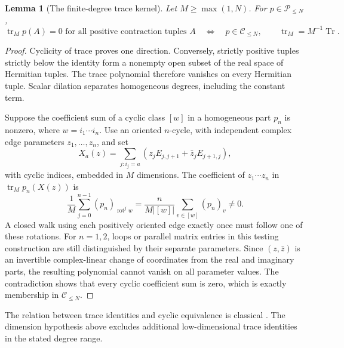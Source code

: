 \documentclass[11pt,a4paper]{amsart}
\numberwithin{equation}{section}
\newtheorem{lemma}[theorem]{Lemma}
\theoremstyle{definition}
\theoremstyle{remark}
\newcommand{\PP}{\mathcal P}
\DeclareMathOperator{\Tr}{Tr}
\DeclareMathOperator{\tr}{tr}
\begin{document}
\begin{lemma}[The finite-degree trace kernel]\label{lem:cyclic_trace_kernel}
Let $M\ge\max(1,N)$. For $p\in\PP_{\le N}$,
\begin{equation}\label{eq:trace_kernel_iff}
 \tr_Mp(A)=0\text{ for all positive contraction tuples }A
 \quad\Longleftrightarrow\quad p\in\mathscr C_{\le N},
 \qquad \tr_M=M^{-1}\Tr.
\end{equation}
\end{lemma}
\begin{proof}
Cyclicity of trace proves one direction. Conversely, strictly positive tuples strictly below the identity form a nonempty open subset of the real space of Hermitian tuples. The trace polynomial therefore vanishes on every Hermitian tuple. Scalar dilation separates homogeneous degrees, including the constant term.

Suppose the coefficient sum of a cyclic class $[w]$ in a homogeneous part $p_n$ is nonzero, where $w=i_1\cdots i_n$. Use an oriented $n$-cycle, with independent complex edge parameters $z_1,\ldots,z_n$, and set
\[
 X_a(z)=\sum_{j:i_j=a}(z_jE_{j,j+1}+\bar z_jE_{j+1,j}),
\]
with cyclic indices, embedded in $M$ dimensions. The coefficient of $z_1\cdots z_n$ in $\tr_Mp_n(X(z))$ is
\[
 \frac1M\sum_{j=0}^{n-1}(p_n)_{\operatorname{rot}^jw}
 =\frac{n}{M|[w]|}\sum_{v\in[w]}(p_n)_v\ne0.
\]
A closed walk using each positively oriented edge exactly once must follow one of these rotations. For $n=1,2$, loops or parallel matrix entries in this testing construction are still distinguished by their separate parameters. Since $(z,\bar z)$ is an invertible complex-linear change of coordinates from the real and imaginary parts, the resulting polynomial cannot vanish on all parameter values. The contradiction shows that every cyclic coefficient sum is zero, which is exactly membership in $\mathscr C_{\le N}$.
\end{proof}
The relation between trace identities and cyclic equivalence is classical \cite{BCKP,KS}. The dimension hypothesis above excludes additional low-dimensional trace identities in the stated degree range.
\end{document}
